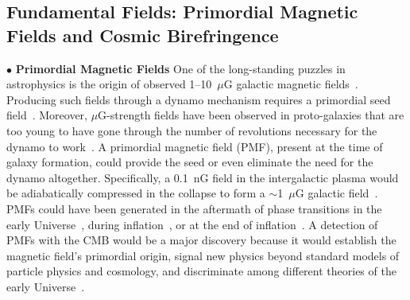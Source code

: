 \documentclass[PICOAPC.tex]{subfiles}
\begin{document}



\subsection{Fundamental Fields: Primordial Magnetic Fields and Cosmic Birefringence}

$\bullet$ {\bf Primordial Magnetic Fields} \hspace{0.1in} One of the long-standing puzzles in astrophysics is the origin of observed 1--10~$\mu$G galactic magnetic fields~\citep{Widrow:2002ud}. Producing such fields through a dynamo mechanism requires a primordial seed field~\citep{Widrow:2011hs}. Moreover, $\mu$G-strength fields have been observed in proto-galaxies that are too young to have gone through the number of revolutions necessary for the dynamo to work~\citep{Athreya:1998}. A primordial magnetic field (PMF), present at the time of galaxy formation, could provide the seed or even eliminate the need for the dynamo altogether. Specifically, a 0.1~nG field in the intergalactic plasma would be adiabatically compressed in the collapse to form a $\sim$1~$\mu$G galactic field~\citep{Grasso:2000wj}.
PMFs could have been generated in the aftermath of phase transitions in the early Universe~\citep{Vachaspati:1991nm}, during inflation~\cite{Turner:1987bw,Ratra:1991bn}, or at the end of inflation~\cite{DiazGil:2007dy}. A detection of PMFs with the CMB would be a major discovery because it would establish the magnetic field's primordial origin, signal new physics beyond standard models of particle physics and cosmology, and discriminate among different theories of the early Universe~\cite{Barnaby:2012tk,Long:2013tha,Durrer:2013pga}.
\end{document}
